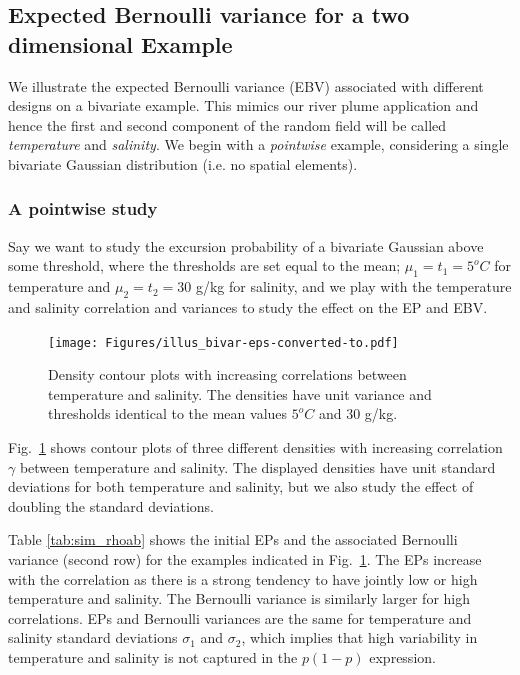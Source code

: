 \documentclass[aoas,preprint]{imsart}
\begin{document}
\subsection{Expected Bernoulli variance for a two dimensional Example}
\label{Sec:UnivarEx}

We illustrate the expected Bernoulli variance (EBV) associated with
different designs on a bivariate example. This mimics our river plume
application and hence the first and second component of the random
field will be called \textit{temperature} and \textit{salinity}. We
begin with a \textit{pointwise} example, considering a single
bivariate Gaussian distribution (i.e. no spatial elements).

\subsubsection{A pointwise study}

Say we want to study the excursion probability of a bivariate Gaussian
above some threshold, where the thresholds are set equal to the mean;
$\mu_1=t_1=5^o C$ for temperature and $\mu_2=t_2=30$ g/kg for
salinity, and we play with the temperature and salinity correlation
and variances to study the effect on the EP and EBV.

\begin{figure}[!b] 
\centering
\texttt{[image: Figures/illus\_bivar-eps-converted-to.pdf]}%
\caption{Density contour plots with increasing correlations between
  temperature and salinity. The densities have unit variance and
  thresholds identical to the mean values $5^o C$ and
  $30$ g/kg.}
\label{illus_bivarDens}
\end{figure}

Fig.~\ref{illus_bivarDens} shows contour plots of three different
densities with increasing correlation $\gamma$ between temperature and
salinity. The displayed densities have unit standard deviations for
both temperature and salinity, but we also study the effect of
doubling the standard deviations.

Table \ref{tab:sim_rhoab} shows the initial EPs and the associated
Bernoulli variance (second row) for the examples indicated in
Fig.~\ref{illus_bivarDens}. The EPs increase with the correlation as
there is a strong tendency to have jointly low or high temperature and
salinity. The Bernoulli variance is similarly larger for high
correlations. EPs and Bernoulli variances are the same for temperature
and salinity standard deviations $\sigma_1$ and $\sigma_2$, which
implies that high variability in temperature and salinity is not
captured in the $p(1-p)$ expression.
\end{document}
